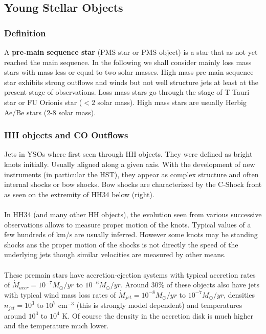 \documentclass[10pt,a4paper]{article}
\begin{document}
\subsection{Young Stellar Objects}
\subsubsection{Definition}
A \textbf{pre-main sequence star} (PMS star or PMS object) is a star that as not yet reached the main sequence. In the following we shall consider mainly loss mass stars with mass less or equal to two solar masses. High mass pre-main sequence star exhibits strong outflows and winds but not well structure jets at least at the present stage of observations. Loss mass stars go through the stage of T Tauri star or FU Orionis star ($<2$ solar mass). High mass stars are usually Herbig Ae/Be stars (2-8 solar mass).
\subsubsection{HH objects and CO Outflows}
Jets in YSOs where first seen through HH objects. They were defined as bright knots initially. Usually aligned along a given axis. With the development of new instruments (in particular the HST), they appear as complex structure and often internal shocks or bow shocks. Bow shocks are characterized by the C-Shock front as seen on the extremity of HH34 below (right).\\
\\
In HH34 (and many other HH objects), the evolution seen from various successive observations allows to measure proper motion of the knots. Typical values of a few hundreds of km/s are usually inferred. However some knots may be standing shocks ans the proper motion of the shocks is not directly the speed of the underlying jets though similar velocities are measured by other means.\\
\\
These premain stars have accretion-ejection systems with typical accretion rates of $\dot{M}_{accr}=10^{-7}M_{\odot} /yr$ to $10^{-6}M_{\odot} /yr$. Around $30\%$ of these objects also have jets with typical wind mass loss rates of $\dot{M}_{jet}=10^{-8}M_{\odot} /yr$ to $10^{-7}M_{\odot} /yr$, densities $n_{jet}=10^3$ to $10^7$ cm$^{-3}$ (this is strongly model dependent) and temperatures around $10^3$ to $10^4$ K. Of course the density in the accretion disk is much higher and the temperature much lower.
\end{document}
